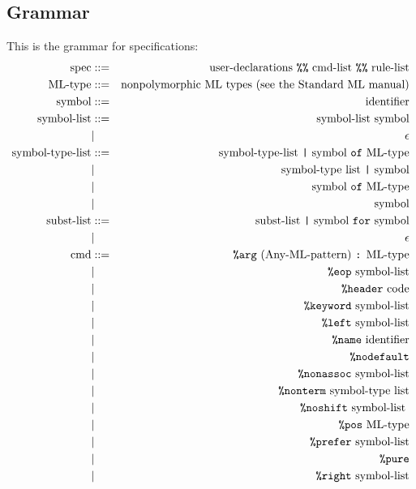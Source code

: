 \documentclass{article}
\begin{document}
\subsection{Grammar}

This is the grammar for specifications:
\begin{eqnarray*}
\mbox{spec} & ::= & \mbox{user-declarations {\tt \%\%} cmd-list {\tt \%\%} rule-list} \\
\mbox{ML-type} & ::= & \mbox{nonpolymorphic ML types (see the Standard ML manual)} \\
\mbox{symbol} & ::= & \mbox{identifier} \\
\mbox{symbol-list} & ::= & \mbox{symbol-list symbol} \\
              &  | & \epsilon \\
\mbox{symbol-type-list} & ::= & \mbox{symbol-type-list {\tt |} symbol {\tt of} ML-type} \\
                   & | & \mbox{symbol-type list {\tt |} symbol} \\
                   & | & \mbox{symbol {\tt of} ML-type} \\
                   & | & \mbox{symbol} \\
\mbox{subst-list} & ::= & \mbox{subst-list {\tt |} symbol {\tt for} symbol} \\
             &  |  & \epsilon \\
\mbox{cmd} & ::= & \mbox{{\tt \%arg} (Any-ML-pattern) {\tt :} ML-type} \\
 & | & \mbox{{\tt \%eop} symbol-list} \\
 & | & \mbox{{\tt \%header} code} \\
 & | & \mbox{{\tt \%keyword} symbol-list} \\
 & | & \mbox{{\tt \%left} symbol-list} \\
 & | & \mbox{{\tt \%name} identifier} \\
 & | & \mbox{{\tt \%nodefault}} \\
 & | & \mbox{{\tt \%nonassoc} symbol-list} \\
 & | & \mbox{{\tt \%nonterm} symbol-type list} \\
 & | & \mbox{{\tt \%noshift} symbol-list } \\
 & | & \mbox{{\tt \%pos} ML-type} \\
 & | & \mbox{{\tt \%prefer} symbol-list} \\
 & | & \mbox{\tt \%pure} \\
 & | & \mbox{{\tt \%right} symbol-list} \\

\end{eqnarray*}
\end{document}
